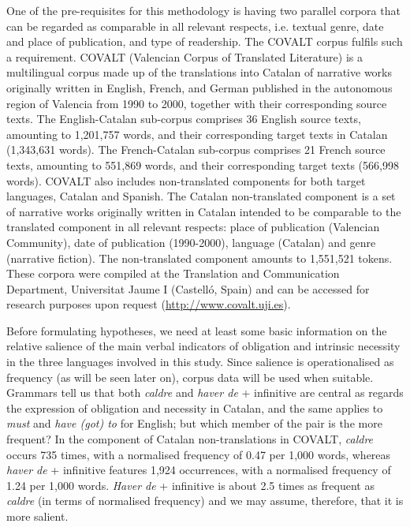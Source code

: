 \documentclass[output=paper,english,spanish,german,english]{langsci/langscibook}
\begin{document}
One of the pre-requisites for this methodology is having two parallel corpora that can be regarded as comparable in all relevant respects, i.e. textual genre, date and place of publication, and type of readership. The COVALT corpus fulfils such a requirement. COVALT (Valencian Corpus of Translated Literature) is a multilingual corpus made up of the translations into Catalan of narrative works originally written in English, French, and German published in the autonomous region of Valencia from 1990 to 2000, together with their corresponding source texts. The English-Catalan sub-corpus comprises 36 English source texts, amounting to 1,201,757 words, and their corresponding target texts in Catalan (1,343,631 words). The French-Catalan sub-corpus comprises 21 French source texts, amounting to 551,869 words, and their corresponding target texts (566,998 words). COVALT also includes non-translated components for both target languages, Catalan and Spanish. The Catalan non-translated component is a set of narrative works originally written in Catalan intended to be comparable to the translated component in all relevant respects: place of publication (Valencian Community), date of publication (1990-2000), language (Catalan) and genre (narrative fiction). The non-translated component amounts to 1,551,521 tokens. These corpora were compiled at the Translation and Communication Department, Universitat Jaume I (Castelló, Spain) and can be accessed for research purposes upon request (\url{http://www.covalt.uji.es}).

Before formulating hypotheses, we need at least some basic information on the relative salience of the main verbal indicators of obligation and intrinsic necessity in the three languages involved in this study. Since salience is operationalised as frequency (as will be seen later on), corpus data will be used when suitable. Grammars tell us that both \textit{caldre} and \textit{haver de} + infinitive are central as regards the expression of obligation and necessity in Catalan, and the same applies to \textit{must} and \textit{have (got) to} for English; but which member of the pair is the more frequent? In the component of Catalan non-translations in COVALT, \textit{caldre} occurs 735 times, with a normalised frequency of 0.47 per 1,000 words, whereas \textit{haver de} + infinitive features 1,924 occurrences, with a normalised frequency of 1.24 per 1,000 words. \textit{Haver de} + infinitive is about 2.5 times as frequent as \textit{caldre} (in terms of normalised frequency) and we may assume, therefore, that it is more salient.
\end{document}
